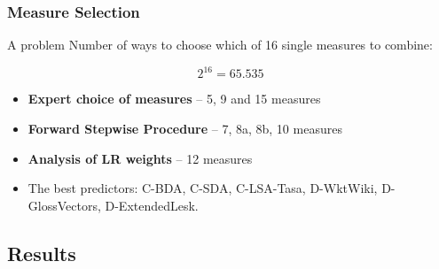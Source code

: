 \documentclass{beamer}
\begin{document}
\begin{frame}
\frametitle{Measure Selection}

\begin{block}{A problem}
 Number of ways to choose which of 16 single measures to combine:

$$ 2^{16}=65.535$$
 
\end{block}


\begin{itemize}
 
\item \textbf{Expert choice of measures} -- 5, 9 and 15 measures
\item \textbf{Forward Stepwise Procedure} -- 7, 8a, 8b, 10 measures 
\item \textbf{Analysis of LR weights} -- 12 measures

\pause

\item The \alert{best predictors}: C-BDA, C-SDA, C-LSA-Tasa, D-WktWiki, D-GlossVectors,  D-ExtendedLesk.


\end{itemize}
\end{frame}
  


\subsection{Results}


%		
	
\end{document}
